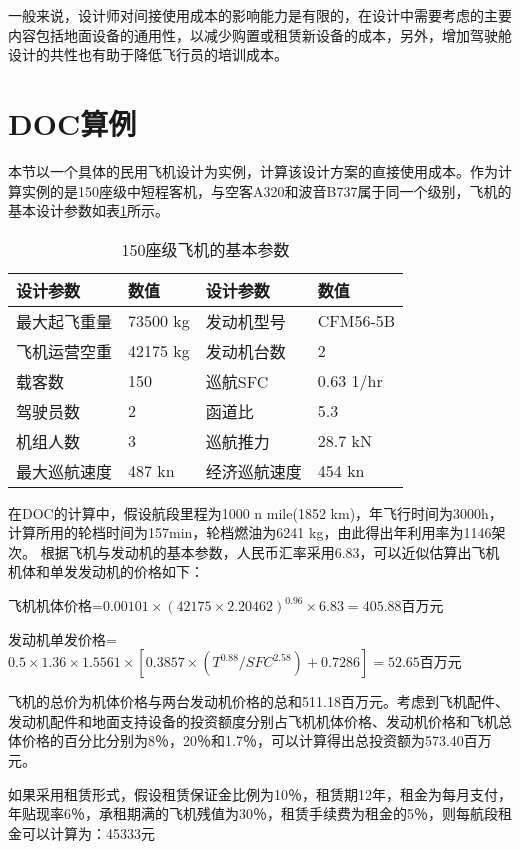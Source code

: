 一般来说，设计师对间接使用成本的影响能力是有限的，在设计中需要考虑的主要内容包括地面设备的通用性，以减少购置或租赁新设备的成本，另外，增加驾驶舱设计的共性也有助于降低飞行员的培训成本。

\section{DOC算例}\label{c13.4}
本节以一个具体的民用飞机设计为实例，计算该设计方案的直接使用成本。作为计算实例的是150座级中短程客机，与空客A320和波音B737属于同一个级别，飞机的基本设计参数如表\ref{table_docexample}所示。

\begin{table}
\centering \caption{150座级飞机的基本参数}
\label{table_docexample}     %
\begin{tabular}{p{}p{}||p{}p{}}
\hline \hline 设计参数 & 数值 & 设计参数 & 数值 \\
\hline 最大起飞重量 &73500 kg &发动机型号 &CFM56-5B \\
飞机运营空重 &42175 kg   &发动机台数  &2 \\
载客数  &150 &巡航SFC &0.63 1/hr\\
驾驶员数  &2  &函道比 &5.3 \\
机组人数  &3  &巡航推力   &28.7 kN\\
最大巡航速度   &487 kn  &经济巡航速度  &454 kn\\
\hline \hline
\end{tabular}
\end{table}

在DOC的计算中，假设航段里程为1000 n mile(1852 km)，年飞行时间为3000h，计算所用的轮档时间为157min，轮档燃油为6241 kg，由此得出年利用率为1146架次。
根据飞机与发动机的基本参数，人民币汇率采用6.83，可以近似估算出飞机机体和单发发动机的价格如下：

飞机机体价格=$0.00101\times(42175\times2.20462)^{0.96}\times6.83=405.88$百万元

发动机单发价格=$0.5\times1.36\times1.5561\times[0.3857\times(T^{0.88}/SFC^{2.58})+0.7286]=52.65$百万元

飞机的总价为机体价格与两台发动机价格的总和511.18百万元。考虑到飞机配件、发动机配件和地面支持设备的投资额度分别占飞机机体价格、发动机价格和飞机总体价格的百分比分别为8％，20％和1.7％，可以计算得出总投资额为573.40百万元。

如果采用租赁形式，假设租赁保证金比例为10％，租赁期12年，租金为每月支付，年贴现率6％，承租期满的飞机残值为30％，租赁手续费为租金的5％，则每航段租金可以计算为：45333元


